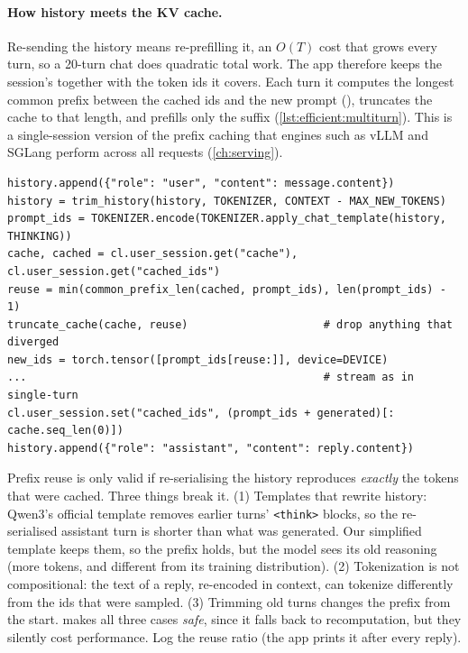 \paragraph{How history meets the KV cache.} Re-sending the history means re-prefilling
it, an $O(T)$ cost that grows every turn, so a 20-turn chat does quadratic total work.
The app therefore keeps the session's  together with the token ids it
covers. Each turn it computes the longest common prefix between the cached ids and the
new prompt (), truncates the cache to that length, and
prefills only the suffix (\cref{lst:efficient:multiturn}). This is a single-session
version of the prefix caching that engines such as vLLM and SGLang perform across all
requests (\cref{ch:serving}).

\begin{lstlisting}[caption={The heart of \ident{chat_multi_turn.py}: history in, KV cache
reused.},label={lst:efficient:multiturn}]
history.append({"role": "user", "content": message.content})
history = trim_history(history, TOKENIZER, CONTEXT - MAX_NEW_TOKENS)
prompt_ids = TOKENIZER.encode(TOKENIZER.apply_chat_template(history, THINKING))
cache, cached = cl.user_session.get("cache"), cl.user_session.get("cached_ids")
reuse = min(common_prefix_len(cached, prompt_ids), len(prompt_ids) - 1)
truncate_cache(cache, reuse)                     # drop anything that diverged
new_ids = torch.tensor([prompt_ids[reuse:]], device=DEVICE)
...                                              # stream as in single-turn
cl.user_session.set("cached_ids", (prompt_ids + generated)[: cache.seq_len(0)])
history.append({"role": "assistant", "content": reply.content})
\end{lstlisting}

\begin{pitfall}
Prefix reuse is only valid if re-serialising the history reproduces \emph{exactly} the
tokens that were cached. Three things break it. (1) Templates that rewrite history:
Qwen3's official template removes earlier turns' \texttt{<think>} blocks, so the
re-serialised assistant turn is shorter than what was generated. Our simplified
template keeps them, so the prefix holds, but the model sees its old reasoning (more
tokens, and different from its training distribution). (2) Tokenization is not
compositional: the text of a reply, re-encoded in context, can tokenize differently
from the ids that were sampled. (3) Trimming old turns changes the prefix from the
start.  makes all three cases \emph{safe}, since it falls back
to recomputation, but they silently cost performance. Log the reuse ratio (the app
prints it after every reply).
\end{pitfall}

